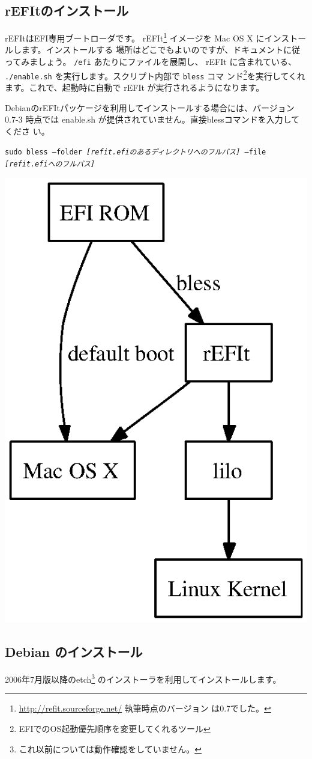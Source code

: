 \documentclass[mingoth,a4paper]{jsarticle}
\begin{document}
\subsection{rEFItのインストール}

rEFItはEFI専用ブートローダです。
rEFIt\footnote{\url{http://refit.sourceforge.net/} 執筆時点のバージョン
は0.7でした。} イメージを Mac OS X にインストールします。インストールする
場所はどこでもよいのですが、ドキュメントに従ってみましょう。
\texttt{/efi} あたりにファイルを展開し、 rEFIt に含まれている、
\texttt{./enable.sh} を実行します。スクリプト内部で \texttt{bless} コマ
ンド\footnote{EFIでのOS起動優先順序を変更してくれるツール}を実行してくれ
ます。これで、起動時に自動で rEFIt が実行されるようになります。

DebianのrEFItパッケージを利用してインストールする場合には、バージョン0.7-3 
時点では enable.sh が提供されていません。直接blessコマンドを入力してくださ
い。

\texttt{sudo bless --folder \textit{[refit.efiのあるディレクトリへのフルパス]} --file \textit{[refit.efiへのフルパス]}}

\begin{center}
  \includegraphics[width=0.5\hsize]{image200607/bootchain.ps}
\end{center}

\subsection{Debian のインストール}

2006年7月版以降のetch\footnote{これ以前については動作確認をしていません。} 
のインストーラを利用してインストールします。
\end{document}
